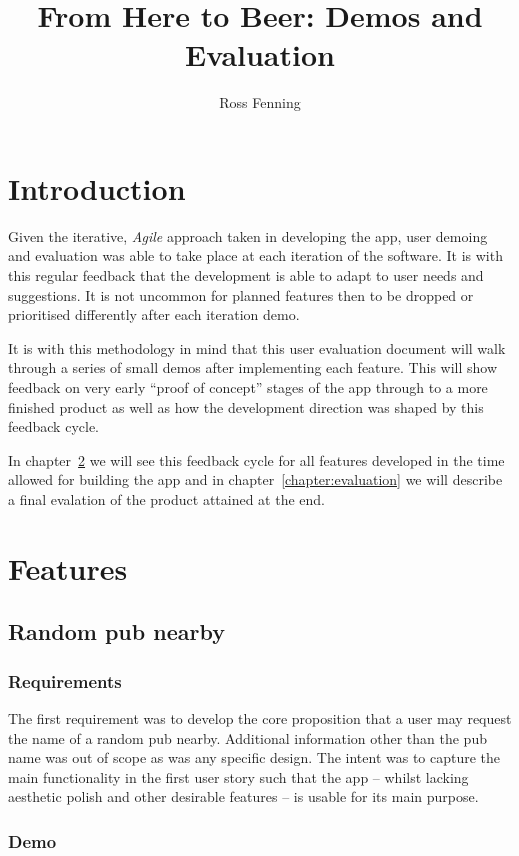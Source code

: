 \documentclass{report}
\title{From Here to Beer: Demos and Evaluation}
\author{Ross Fenning}
\begin{document}
\maketitle

\chapter{Introduction}

Given the iterative, \emph{Agile} approach taken in developing the app,
user demoing and evaluation was able to take place at each iteration of the
software. It is with this regular feedback that the development is able
to adapt to user needs and suggestions. It is not uncommon for planned
features then to be dropped or prioritised differently after each
iteration demo.

It is with this methodology in mind that this user evaluation document
will walk through a series of small demos after implementing each feature.
This will show feedback on very early ``proof of concept'' stages of
the app through to a more finished product as well as how the development
direction was shaped by this feedback cycle.

In chapter~\ref{chapter:features} we will see this feedback cycle for
all features developed in the time allowed for building the app and
in chapter~\ref{chapter:evaluation} we will describe a final evalation
of the product attained at the end.

\chapter{Features}
\label{chapter:features}
\section{Random pub nearby}
\subsection{Requirements}
The first requirement was to develop the core proposition that a user may
request the name of a random pub nearby. Additional information other than
the pub name was out of scope as was any specific design. The intent was
to capture the main functionality in the first user story such that
the app -- whilst lacking aesthetic polish and other desirable features --
is usable for its main purpose.

\subsection{Demo}
\end{document}
